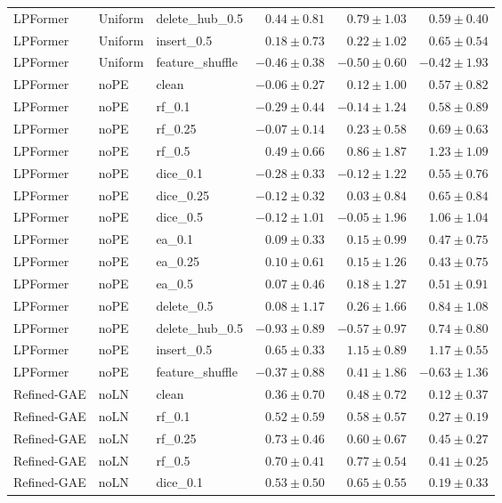 \documentclass[UTF8,a4paper,11pt,fontset=fandol]{ctexart}
\begin{document}
{\begin{longtable}{lllrrr}
LPFormer & Uniform & delete\_hub\_0.5 & $0.44\pm0.81$ & $0.79\pm1.03$ & $0.59\pm0.40$ \\
LPFormer & Uniform & insert\_0.5 & $0.18\pm0.73$ & $0.22\pm1.02$ & $0.65\pm0.54$ \\
LPFormer & Uniform & feature\_shuffle & $-0.46\pm0.38$ & $-0.50\pm0.60$ & $-0.42\pm1.93$ \\
LPFormer & noPE & clean & $-0.06\pm0.27$ & $0.12\pm1.00$ & $0.57\pm0.82$ \\
LPFormer & noPE & rf\_0.1 & $-0.29\pm0.44$ & $-0.14\pm1.24$ & $0.58\pm0.89$ \\
LPFormer & noPE & rf\_0.25 & $-0.07\pm0.14$ & $0.23\pm0.58$ & $0.69\pm0.63$ \\
LPFormer & noPE & rf\_0.5 & $0.49\pm0.66$ & $0.86\pm1.87$ & $1.23\pm1.09$ \\
LPFormer & noPE & dice\_0.1 & $-0.28\pm0.33$ & $-0.12\pm1.22$ & $0.55\pm0.76$ \\
LPFormer & noPE & dice\_0.25 & $-0.12\pm0.32$ & $0.03\pm0.84$ & $0.65\pm0.84$ \\
LPFormer & noPE & dice\_0.5 & $-0.12\pm1.01$ & $-0.05\pm1.96$ & $1.06\pm1.04$ \\
LPFormer & noPE & ea\_0.1 & $0.09\pm0.33$ & $0.15\pm0.99$ & $0.47\pm0.75$ \\
LPFormer & noPE & ea\_0.25 & $0.10\pm0.61$ & $0.15\pm1.26$ & $0.43\pm0.75$ \\
LPFormer & noPE & ea\_0.5 & $0.07\pm0.46$ & $0.18\pm1.27$ & $0.51\pm0.91$ \\
LPFormer & noPE & delete\_0.5 & $0.08\pm1.17$ & $0.26\pm1.66$ & $0.84\pm1.08$ \\
LPFormer & noPE & delete\_hub\_0.5 & $-0.93\pm0.89$ & $-0.57\pm0.97$ & $0.74\pm0.80$ \\
LPFormer & noPE & insert\_0.5 & $0.65\pm0.33$ & $1.15\pm0.89$ & $1.17\pm0.55$ \\
LPFormer & noPE & feature\_shuffle & $-0.37\pm0.88$ & $0.41\pm1.86$ & $-0.63\pm1.36$ \\
Refined-GAE & noLN & clean & $0.36\pm0.70$ & $0.48\pm0.72$ & $0.12\pm0.37$ \\
Refined-GAE & noLN & rf\_0.1 & $0.52\pm0.59$ & $0.58\pm0.57$ & $0.27\pm0.19$ \\
Refined-GAE & noLN & rf\_0.25 & $0.73\pm0.46$ & $0.60\pm0.67$ & $0.45\pm0.27$ \\
Refined-GAE & noLN & rf\_0.5 & $0.70\pm0.41$ & $0.77\pm0.54$ & $0.41\pm0.25$ \\
Refined-GAE & noLN & dice\_0.1 & $0.53\pm0.50$ & $0.65\pm0.55$ & $0.19\pm0.33$ \\

\end{longtable}}
\end{document}
